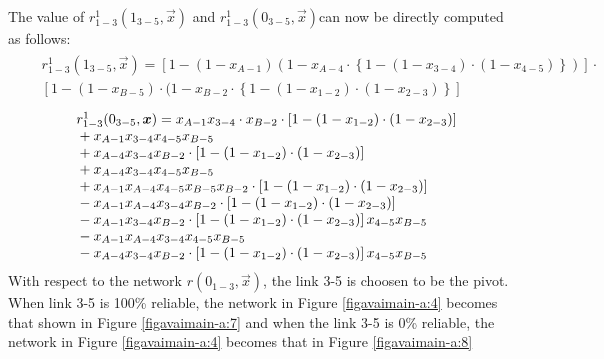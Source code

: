 The value of $r_{1 - 3}^1({1_{3 - 5}},\vec x)$ and $r_{1 - 3}^1({0_{3 -
5}},\vec x)$can now be directly computed as follows:
\begin{eqnarray}
&& \begin{array}{l}
r_{1 - 3}^1({1_{3 - 5}},\vec x) = \left[ {1 - (1 - {x_{A - 1}})(1 - {x_{A - 4}}
\cdot \left\{ {1 - (1 - {x_{3 - 4}}) \cdot (1 - {x_{4 - 5}})} \right\})} \right]
\cdot \\
\left[ {1 - (1 - {x_{B - 5}}) \cdot (1 - {x_{B - 2}} \cdot \left\{ {1 - (1 -
{x_{1 - 2}}) \cdot (1 - {x_{2 - 3}})} \right\}} \right]
\end{array}
\label{eqavaimain:7}
\end{eqnarray}
\begin{eqnarray}
&& \begin{array}{l}
r_{1 - 3}^1({0_{3 - 5}},\vec x) = {x_{A - 1}}{x_{3 - 4}} \cdot {x_{B - 2}} \cdot
\left[ {1 - (1 - {x_{1 - 2}}) \cdot (1 - {x_{2 - 3}})} \right]\\
{\rm{                 }} + {x_{A - 1}}{x_{3 - 4}}{x_{4 - 5}}{x_{B - 5}}\\
{\rm{                 }} + {x_{A - 4}}{x_{3 - 4}}{x_{B - 2}} \cdot \left[ {1 -
(1 - {x_{1 - 2}}) \cdot (1 - {x_{2 - 3}})} \right]\\
{\rm{                 }} + {x_{A - 4}}{x_{3 - 4}}{x_{4 - 5}}{x_{B - 5}}\\
{\rm{                 }} + {x_{A - 1}}{x_{A - 4}}{x_{4 - 5}}{x_{B - 5}}{x_{B -
2}} \cdot \left[ {1 - (1 - {x_{1 - 2}}) \cdot (1 - {x_{2 - 3}})} \right]\\
{\rm{                 }} - {x_{A - 1}}{x_{A - 4}}{x_{3 - 4}}{x_{B - 2}} \cdot
\left[ {1 - (1 - {x_{1 - 2}}) \cdot (1 - {x_{2 - 3}})} \right]\\
{\rm{                 }} - {x_{A - 1}}{x_{3 - 4}}{x_{B - 2}} \cdot \left[ {1 -
(1 - {x_{1 - 2}}) \cdot (1 - {x_{2 - 3}})} \right]{x_{4 - 5}}{x_{B - 5}}\\
{\rm{                 }} - {x_{A - 1}}{x_{A - 4}}{x_{3 - 4}}{x_{4 - 5}}{x_{B -
5}}\\
{\rm{                 }} - {x_{A - 4}}{x_{3 - 4}}{x_{B - 2}} \cdot \left[ {1 -
(1 - {x_{1 - 2}}) \cdot (1 - {x_{2 - 3}})} \right]{x_{4 - 5}}{x_{B - 5}}
\end{array}
\label{eqavaimain:8}
\end{eqnarray}
With respect to the network $r({0_{1 - 3}},\vec x)$, the link 3-5 is
choosen to be the pivot. When link 3-5 is 100\% reliable, the network in Figure
\ref{figavaimain-a:4} becomes that shown in Figure \ref{figavaimain-a:7} and when the link 3-5 is 0\%
reliable, the network in Figure \ref{figavaimain-a:4} becomes that in Figure \ref{figavaimain-a:8}

